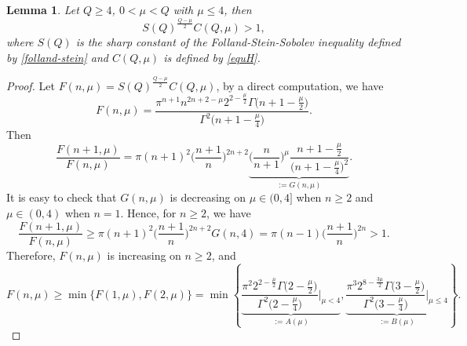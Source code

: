 \documentclass[11pt]{article}
\newtheorem{lemma}{Lemma}[section]
\begin{document}
\begin{lemma}\label{tech}
Let $Q\geq 4$, $0<\mu< Q$ with $\mu\leq 4$, then
\begin{equation*}
  S(Q)^{\frac{Q-\mu}{2}}C(Q,\mu)>1,
\end{equation*}
where $S(Q)$ is the sharp constant of the Folland-Stein-Sobolev inequality defined by \eqref{folland-stein} and $C(Q,\mu)$ is defined by \eqref{equH}.
\end{lemma}
\begin{proof}
Let $F(n,\mu)=S(Q)^{\frac{Q-\mu}{2}}C(Q,\mu)$, by a direct computation, we have
\begin{equation*}
  F(n,\mu)=\frac{\pi^{n+1}n^{2n+2-\mu}2^{2-\frac{\mu}{2}}\Gamma\big(n+1-\frac{\mu}{2}\big)}{\Gamma^2\big(n+1-\frac{\mu}{4}\big)}.
\end{equation*}
Then
\begin{equation*}
  \frac{F(n+1,\mu)}{F(n,\mu)}=\pi(n+1)^2\Big(\frac{n+1}{n}\Big)^{2n+2}
  \underbrace{\Big(\frac{n}{n+1}\Big)^
  \mu\frac{n+1-\frac{\mu}{2}}{\big(n+1-\frac{\mu}{4}\big)^2}}_{:=G(n,\mu)}.
\end{equation*}
It is easy to check that $G(n,\mu)$ is decreasing on $\mu\in (0,4]$ when $n\geq2$ and $\mu\in (0,4)$ when $n=1$. Hence, for $n\geq2$, we have
\begin{equation*}
  \frac{F(n+1,\mu)}{F(n,\mu)}\geq\pi(n+1)^2\Big(\frac{n+1}{n}\Big)^{2n+2}
  G(n,4)=
  \pi(n-1)\Big(\frac{n+1}{n}\Big)^{2n}>1.
\end{equation*}
Therefore, $F(n,\mu)$ is increasing on $n\geq2$, and
\begin{equation*}
  F(n,\mu)\geq \min\{F(1,\mu),F(2,\mu)\}=\min\left\{
  \underbrace{\frac{\pi^{2}2^{2-\frac{\mu}{2}}\Gamma\big(2-\frac{\mu}{2}\big)}{\Gamma^2\big(2-\frac{\mu}{4}\big)}\bigg|_{\mu<4}}_{:=A(\mu)},
  \underbrace{\frac{\pi^{3}2^{8-\frac{3\mu}{2}}\Gamma\big(3-\frac{\mu}{2}\big)}{\Gamma^2\big(3-\frac{\mu}{4}\big)}\bigg|_{\mu\leq 4}}_{:=B(\mu)}\right\}.
\end{equation*}


\end{proof}
\end{document}
